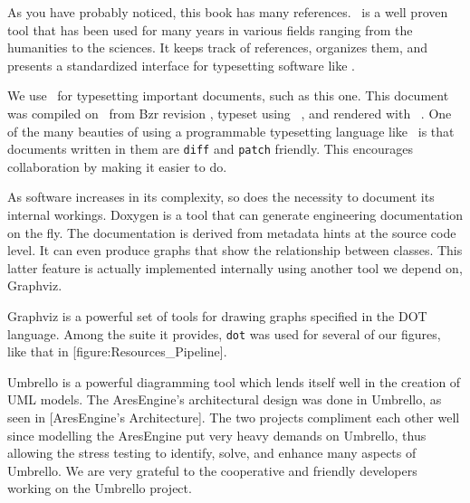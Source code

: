 

\startitemize[4]
\head {\em \BIBTEX}

As you have probably noticed, this book has many references. \BIBTEX\ is a well proven tool that has been used for many years in various fields ranging from the humanities to the sciences. It keeps track of references, organizes them, and presents a standardized interface for typesetting software like \CONTEXT.

\head {\em \CONTEXT}

We use \CONTEXT\ for typesetting important documents, such as this one. This document was compiled on \currentdate\ from Bzr revision \BzrRevisionClickable, typeset using \CONTEXT\ \contextversion, and rendered with \texenginename\ \texengineversion. One of the many beauties of using a programmable typesetting language like \CONTEXT\ is that documents written in them are {\tt diff} and {\tt patch} friendly. This encourages collaboration by making it easier to do.


As software increases in its complexity, so does the necessity to document its internal workings. Doxygen is a tool that can generate engineering documentation on the fly. The documentation is derived from metadata hints at the source code level. It can even produce graphs that show the relationship between classes. This latter feature is actually implemented internally using another tool we depend on, Graphviz.


Graphviz is a powerful set of tools for drawing graphs specified in the DOT language. Among the suite it provides, {\tt dot} was used for several of our figures, like that in [figure:Resources_Pipeline].


Umbrello is a powerful diagramming tool which lends itself well in the creation of UML models. The AresEngine's architectural design was done in Umbrello, as seen in [AresEngine's Architecture]. The two projects compliment each other well since modelling the AresEngine put very heavy demands on Umbrello, thus allowing the stress testing to identify, solve, and enhance many aspects of Umbrello. We are very grateful to the cooperative and friendly developers working on the Umbrello project.
\stopitemize

